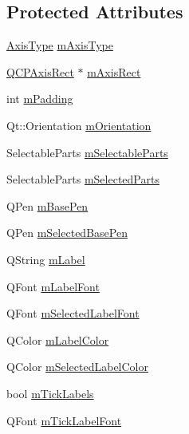 \subsection*{Protected Attributes}
\begin{DoxyCompactItemize}
\item 
\mbox{\hyperlink{class_q_c_p_axis_ae2bcc1728b382f10f064612b368bc18a}{Axis\+Type}} \mbox{\hyperlink{class_q_c_p_axis_ae704bf9f2c2b026f08dd4ccad79c616e}{m\+Axis\+Type}}
\item 
\mbox{\hyperlink{class_q_c_p_axis_rect}{Q\+C\+P\+Axis\+Rect}} $\ast$ \mbox{\hyperlink{class_q_c_p_axis_a6f150b65a202f32936997960e331dfcb}{m\+Axis\+Rect}}
\item 
int \mbox{\hyperlink{class_q_c_p_axis_a52a805a4f03231210e0880db7f77e098}{m\+Padding}}
\item 
Qt\+::\+Orientation \mbox{\hyperlink{class_q_c_p_axis_a048e1792fa86f4f86df55200b3f0be36}{m\+Orientation}}
\item 
Selectable\+Parts \mbox{\hyperlink{class_q_c_p_axis_ab9042d8a095998f27a28b39411d8b9c3}{m\+Selectable\+Parts}}
\item 
Selectable\+Parts \mbox{\hyperlink{class_q_c_p_axis_a8f1eb0abfe2ae64652aa46b360e841e4}{m\+Selected\+Parts}}
\item 
Q\+Pen \mbox{\hyperlink{class_q_c_p_axis_ad6b4a0aee9558fb35529e960b8fef72d}{m\+Base\+Pen}}
\item 
Q\+Pen \mbox{\hyperlink{class_q_c_p_axis_a80baa4e3c16f9b6edf3eccacd2a50fde}{m\+Selected\+Base\+Pen}}
\item 
Q\+String \mbox{\hyperlink{class_q_c_p_axis_ae8001dbdfc47685c1cf7b98b044460e6}{m\+Label}}
\item 
Q\+Font \mbox{\hyperlink{class_q_c_p_axis_a37442d470e30e19b81ecaf979a34d046}{m\+Label\+Font}}
\item 
Q\+Font \mbox{\hyperlink{class_q_c_p_axis_ae48fe3489afadc0b3cd003233e2bf19f}{m\+Selected\+Label\+Font}}
\item 
Q\+Color \mbox{\hyperlink{class_q_c_p_axis_a457a003bb1c2b6ab73e5a173ba7558fd}{m\+Label\+Color}}
\item 
Q\+Color \mbox{\hyperlink{class_q_c_p_axis_a94f57de3ba024471ca206d83cf2258dd}{m\+Selected\+Label\+Color}}
\item 
bool \mbox{\hyperlink{class_q_c_p_axis_a3e4315be072026644e69009557a2fa11}{m\+Tick\+Labels}}
\item 
Q\+Font \mbox{\hyperlink{class_q_c_p_axis_add79d1e39c4ed65869a1e9cc79043f3f}{m\+Tick\+Label\+Font}}
\item 

\end{DoxyCompactItemize}
